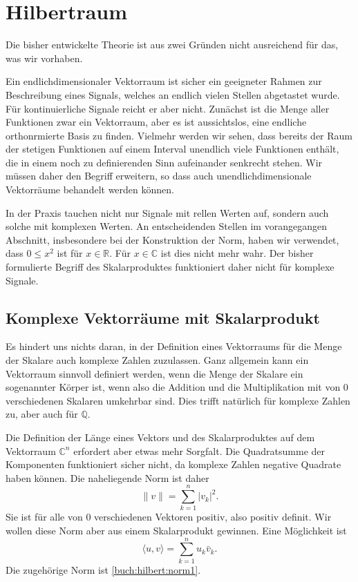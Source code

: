 %
%
%
\section{Hilbertraum
\label{section:hilbertraum}}
Die bisher entwickelte Theorie ist aus zwei Gründen nicht ausreichend für das,
was wir vorhaben.

Ein endlichdimensionaler Vektorraum ist sicher ein geeigneter Rahmen zur
Beschreibung eines Signals, welches an endlich vielen Stellen abgetastet
wurde.
Für kontinuierliche Signale reicht er aber nicht.
Zunächst ist die Menge aller Funktionen zwar ein Vektorraum, aber es ist
aussichtslos, eine endliche orthonrmierte Basis zu finden.
Vielmehr werden wir sehen, dass bereits der Raum der stetigen Funktionen
auf einem Interval unendlich viele Funktionen enthält, die in einem noch
zu definierenden Sinn aufeinander senkrecht stehen.
Wir müssen daher den Begriff erweitern, so dass auch unendlichdimensionale
Vektorräume behandelt werden können.

In der Praxis tauchen nicht nur Signale mit rellen Werten auf, sondern
auch solche mit komplexen Werten.
An entscheidenden Stellen im vorangegangen Abschnitt, insbesondere bei
der Konstruktion der Norm, haben wir verwendet,
dass $0 \le x^2$ ist für $x\in\mathbb R$. Für $x\in\mathbb C$ ist dies
nicht mehr wahr.
Der bisher formulierte Begriff des Skalarproduktes funktioniert daher
nicht für komplexe Signale.

\subsection{Komplexe Vektorräume mit Skalarprodukt}
Es hindert uns nichts daran, in der Definition eines Vektorraums für die
Menge der Skalare auch komplexe Zahlen zuzulassen.
Ganz allgemein kann ein Vektorraum sinnvoll definiert werden, wenn die Menge
der Skalare ein sogenannter Körper ist, wenn also die Addition
und die Multiplikation mit von $0$ verschiedenen Skalaren umkehrbar sind.
Dies trifft natürlich für komplexe Zahlen zu, aber auch für $\mathbb Q$.

Die Definition der Länge eines Vektors und des Skalarproduktes auf dem
Vektorraum $\mathbb C^n$ erfordert aber etwas mehr Sorgfalt.
Die Quadratsumme der Komponenten funktioniert sicher nicht, da komplexe
Zahlen negative Quadrate haben können.
Die naheliegende Norm ist daher
\begin{equation}
\|v\| = \sum_{k=1}^n |v_k|^2.
\label{buch:hilbert:norm1}
\end{equation}
Sie ist für alle von $0$ verschiedenen Vektoren positiv, also positiv
definit.
Wir wollen diese Norm aber aus einem Skalarprodukt gewinnen.
Eine Möglichkeit ist
\begin{equation}
\langle u,v\rangle = \sum_{k=1}^n u_k\bar{v}_k.
\label{hilbert:skalaransatz}
\end{equation}
Die zugehörige Norm ist \eqref{buch:hilbert:norm1}.

